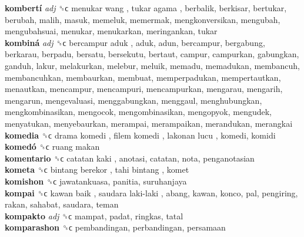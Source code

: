 \textbf{kombertí} \emph{adj}  ␝ϲ   menukar wang ,  tukar agama , berbalik, berkisar, bertukar, berubah, malih, masuk, memeluk, memermak, mengkonversikan, mengubah, mengubahsuai, menukar, menukarkan, meringankan, tukar  \\
\textbf{kombiná} \emph{adj}  ␝ϲ   bercampur aduk , aduk, adun, bercampur, bergabung, berkarau, berpadu, bersatu, bersekutu, bertaut, campur, campurkan, gabungkan, ganduh, lakur, melakurkan, melebur, meluik, memadu, memadukan, membancuh, membancuhkan, membaurkan, membuat, memperpadukan, mempertautkan, menautkan, mencampur, mencampuri, mencampurkan, mengarau, mengarih, mengarun, mengevaluasi, menggabungkan, menggaul, menghubungkan, mengkombinasikan, mengocok, mengombinasikan, mengopyok, mengudek, menyatukan, menyebaurkan, merampai, merampaikan, merandukan, merangkai  \\
\textbf{komedia} ␝ϲ   drama komedi ,  filem komedi ,  lakonan lucu , komedi, komidi  \\
\textbf{komedó} ␝ϲ   ruang makan   \\
\textbf{komentario} ␝ϲ   catatan kaki , anotasi, catatan, nota, penganotasian  \\
\textbf{kometa} ␝ϲ   bintang berekor ,  tahi bintang , komet  \\
\textbf{komishon} ␝ϲ  jawatankuasa, panitia, suruhanjaya  \\
\textbf{kompai} ␝ϲ   kawan baik ,  saudara laki-laki , abang, kawan, konco, pal, pengiring, rakan, sahabat, saudara, teman  \\
\textbf{kompakto} \emph{adj}  ␝ϲ  mampat, padat, ringkas, tatal  \\
\textbf{komparashon} ␝ϲ  pembandingan, perbandingan, persamaan  \\

